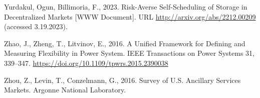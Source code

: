 \documentclass[12pt,a4paper,]{report}
\newlength{\cslhangindent}
\newenvironment{CSLReferences}[2] %
 {%
  \setlength{\parindent}{0pt}
  \ifodd #1 \everypar{\setlength{\hangindent}{\cslhangindent}}\ignorespaces\fi
  \ifnum #2 > 0
  \setlength{\parskip}{#2\baselineskip}
  \fi
 }%
 {}
\begin{document}
\begin{CSLReferences}{1}{0}
\leavevmode{}%
Yurdakul, Ogun, Billimoria, F., 2023. Risk-{Averse Self-Scheduling} of
{Storage} in {Decentralized Markets} {[}WWW Document{]}. URL
\url{http://arxiv.org/abs/2212.00209} (accessed 3.19.2023).

\leavevmode{}%
Zhao, J., Zheng, T., Litvinov, E., 2016. A {Unified Framework} for
{Defining} and {Measuring Flexibility} in {Power System}. IEEE
Transactions on Power Systems 31, 339--347.
\url{https://doi.org/10.1109/tpwrs.2015.2390038}

\leavevmode{}%
Zhou, Z., Levin, T., Conzelmann, G., 2016. Survey of {U}.{S}. {Ancillary
Services Markets}. {Argonne National Laboratory}.

\end{CSLReferences}
\end{document}
